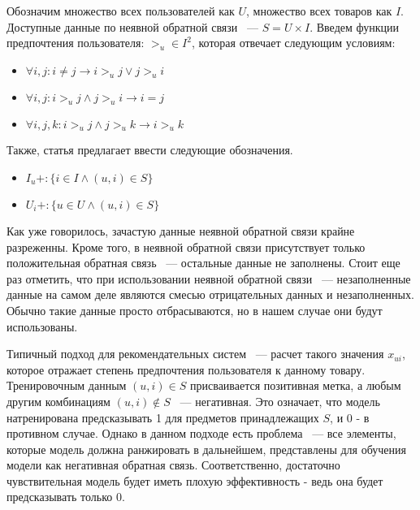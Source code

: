 \documentclass[14pt]{mmcs_article}
\begin{document}
Обозначим множество всех пользователей как $U$, множество всех товаров как $I$. Доступные данные по неявной обратной связи ~---  $S = U \times I$. Введем функции предпочтения пользователя: $ >_u \in I^2$, которая отвечает следующим условиям:
\begin{itemize}
	\item $\forall i, j : i \neq j \rightarrow i >_u j \vee j >_u i$
	\item $\forall i, j : i >_u j \wedge j >_u i \rightarrow i = j$
	\item $\forall i, j, k :  i >_u j \wedge j >_u k  \rightarrow i >_u k $
\end{itemize}
Также, статья \cite{BPR:1205} предлагает ввести следующие обозначения. 
\begin{itemize}
	\item $I_u+: \{i \in I \wedge (u,i) \in S\}$
	\item $U_i+: \{u \in U \wedge (u,i) \in S\}$
\end{itemize}

Как уже говорилось, зачастую данные неявной обратной связи крайне разреженны. Кроме того, в неявной обратной связи присутствует только положительная обратная связь ~--- остальные данные не заполнены. Стоит еще раз отметить, что при использовании неявной обратной связи ~--- незаполненные данные на самом деле являются смесью отрицательных данных и незаполненных.
Обычно такие данные просто отбрасываются, но в нашем случае они будут использованы.

Типичный подход для рекомендательных систем ~--- расчет такого значения $x_{ui}$, которое отражает степень предпочтения пользователя к данному товару. Тренировочным данным $(u,i) \in S$ присваивается позитивная метка, а любым другим комбинациям $(u,i) \notin S$ ~--- негативная. Это означает, что модель натренирована предсказывать 1 для предметов принадлежащих $S$, и 0 - в противном случае. Однако в данном подходе есть проблема ~--- все элементы, которые модель должна ранжировать в дальнейшем, представлены для обучения модели как негативная обратная связь. Соответственно, достаточно чувствительная модель будет иметь плохую эффективность - ведь она будет предсказывать только 0.    
\end{document}
